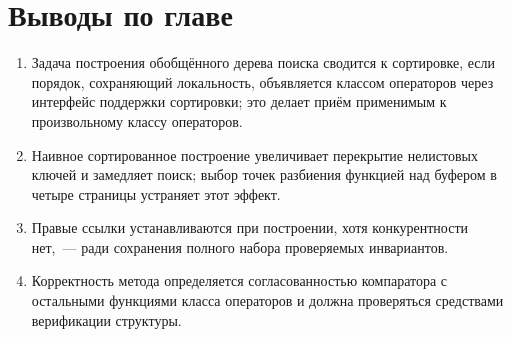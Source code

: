 
\section{Выводы по главе}

\begin{enumerate}
\item Задача построения обобщённого дерева поиска сводится к сортировке, если
      порядок, сохраняющий локальность, объявляется классом операторов через
      интерфейс поддержки сортировки; это делает приём применимым к
      произвольному классу операторов.
\item Наивное сортированное построение увеличивает перекрытие нелистовых ключей
      и замедляет поиск; выбор точек разбиения функцией  над
      буфером в четыре страницы устраняет этот эффект.
\item Правые ссылки устанавливаются при построении, хотя конкурентности нет,~---
      ради сохранения полного набора проверяемых инвариантов.
\item Корректность метода определяется согласованностью компаратора с
      остальными функциями класса операторов и должна проверяться средствами
      верификации структуры.
\end{enumerate}
